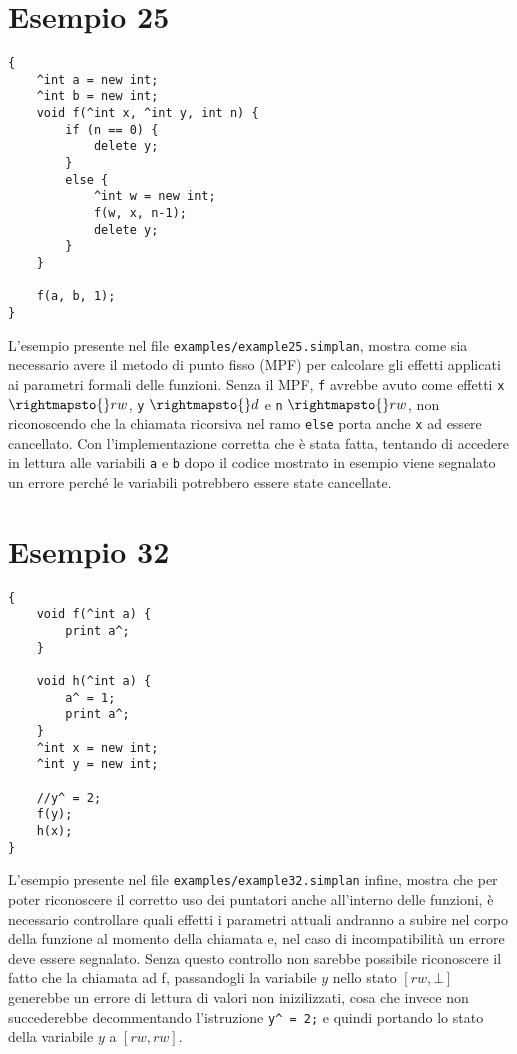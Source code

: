 \documentclass[../report.tex]{subfiles}
\begin{document}
\section{Esempio 25}\label{s:esempio25}
\begin{lstlisting}
{
    ^int a = new int;
    ^int b = new int;
    void f(^int x, ^int y, int n) {
        if (n == 0) {
            delete y;
        }
        else {
            ^int w = new int;
            f(w, x, n-1);
            delete y;
        }
    }

    f(a, b, 1);
}
\end{lstlisting}
L'esempio presente nel file \verb|examples/example25.simplan|, mostra come sia necessario avere il metodo di punto fisso (MPF) per calcolare gli effetti applicati ai parametri formali delle funzioni.
Senza il MPF, \verb|f| avrebbe avuto come effetti \verb|x| $\rightmapsto{} rw$, \verb|y| $\rightmapsto{} d$ e \verb|n| $\rightmapsto{} rw$, non riconoscendo che la chiamata ricorsiva nel ramo \verb|else| porta anche \verb|x| ad essere cancellato.
Con l'implementazione corretta che è stata fatta, tentando di accedere in lettura alle variabili \verb|a| e \verb|b| dopo il codice mostrato in esempio viene segnalato un errore perché le variabili potrebbero essere state cancellate.

\section{Esempio 32}\label{s:esempio32}
\begin{lstlisting}
{
    void f(^int a) {
        print a^;
    }

    void h(^int a) {
        a^ = 1;
        print a^;
    }
    ^int x = new int;
    ^int y = new int;

    //y^ = 2;
    f(y);
    h(x);
}
\end{lstlisting}
L'esempio presente nel file \verb|examples/example32.simplan| infine, mostra che per poter riconoscere il corretto uso dei puntatori anche all'interno delle funzioni, \`e necessario controllare quali effetti i parametri attuali andranno a subire nel corpo della funzione al momento della chiamata e, nel caso di incompatibilit\`a un errore deve essere segnalato. Senza questo controllo non sarebbe possibile riconoscere il fatto che la chiamata ad f, passandogli la variabile $y$ nello stato $[rw, \bot]$ generebbe un errore di lettura di valori non inizilizzati, cosa che invece non succederebbe decommentando l'istruzione \verb|y^ = 2;| e quindi portando lo stato della variabile $y$ a $[rw, rw]$.
\end{document}

